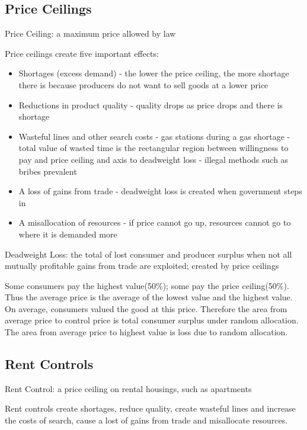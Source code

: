 \documentclass[12pt]{article}
\begin{document}
\subsection{Price Ceilings}
\begin{definition} Price Ceiling: a maximum price allowed by law \end{definition}
Price ceilings create five important effects: \begin{itemize} 
\item Shortages (excess demand) - the lower the price ceiling, the more shortage there is because producers do not want to sell goods at a lower price 
\item Reductions in product quality - quality drops as price drops and there is shortage 
\item Wasteful lines and other search costs - gas stations during a gas shortage - total value of wasted time is the rectangular region between willingness to pay and price ceiling and axis to deadweight loss - illegal methods such as bribes prevalent 
\item A loss of gains from trade - deadweight loss is created when government steps in 
\item A misallocation of resources - if price cannot go up, resources cannot go to where it is demanded more \end{itemize}
\begin{definition} Deadweight Loss: the total of lost consumer and producer surplus when not all mutually profitable gains from trade are exploited; created by price ceilings \end{definition}

Some consumers pay the highest value(50\%); some pay the price ceiling(50\%). Thus the average price is the average of the lowest value and the highest value. On average, consumers valued the good at this price. Therefore the area from average price to control price is total consumer surplus under random allocation. The area from average price to highest value is loss due to random allocation. 

\subsection{Rent Controls}
\begin{definition} Rent Control: a price ceiling on rental housings, such as apartments \end{definition}
Rent controls create shortages, reduce quality, create wasteful lines and increase the costs of search, cause a lost of gains from trade and misallocate resources.
\end{document}
